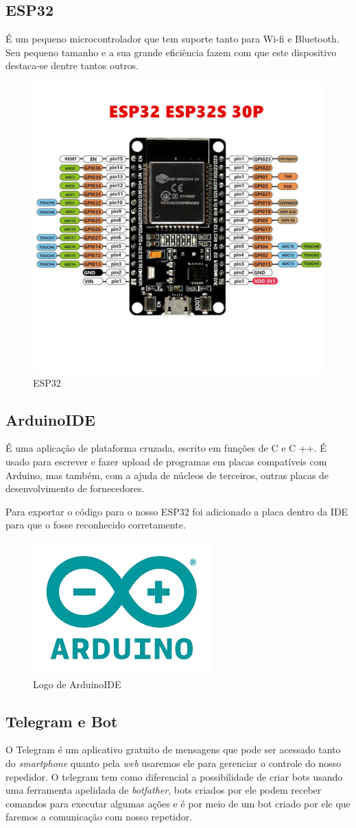\documentclass[12pt]{article}
\begin{document}
\subsection{ESP32}
É um pequeno microcontrolador que tem suporte tanto para Wi-fi e Bluetooth. Seu pequeno tamanho e a sua grande eficiência fazem com que este dispositivo
destaca-se dentre tantos outros.

\begin{figure}[ht]
  \centering
  \includegraphics[width=.35\textwidth]{Images/ESP32.jpg}
  \caption{ESP32}
  \label{fig:exampleESP32}
\end{figure}

\subsection{ArduinoIDE}
É uma aplicação de plataforma cruzada, escrito em funções de C e C ++. É usado para escrever e fazer upload de
programas em placas compatíveis com Arduino, mas também, com a ajuda de núcleos de terceiros, outras placas de
desenvolvimento de fornecedores.

Para exportar o código para o nosso ESP32 foi adicionado a placa dentro da IDE para que o fosse reconhecido corretamente.

\begin{figure}[ht]
  \centering
  \includegraphics[width=.25\textwidth]{Images/arduinoIDELogo.png}
  \caption{Logo de ArduinoIDE}
  \label{fig:exampleArduinoIDE}
\end{figure}


\subsection{Telegram e Bot}
O Telegram é um aplicativo gratuito de mensagens que pode ser acessado tanto do \emph{smartphone} quanto pela \emph{web}
usaremos ele para gerenciar o controle do nosso repedidor.
O telegram tem como diferencial a possibilidade de criar bots usando uma ferramenta apelidada de \emph{botfather},
bots criados por ele podem receber comandos para executar algumas ações e é por meio de um bot criado por ele que faremos a comunicação com
nosso repetidor.
\end{document}
